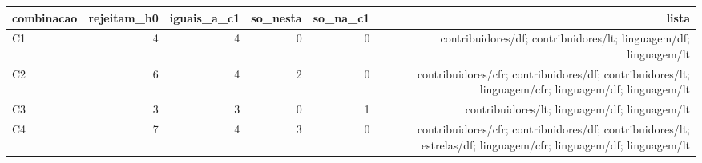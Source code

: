 \begin{tabular}{lrrrrr}
\hline
combinacao & rejeitam\_h0 & iguais\_a\_c1 & so\_nesta & so\_na\_c1 & lista \\
\hline
C1 & 4 & 4 & 0 & 0 & contribuidores/df; contribuidores/lt; linguagem/df; linguagem/lt \\
C2 & 6 & 4 & 2 & 0 & contribuidores/cfr; contribuidores/df; contribuidores/lt; linguagem/cfr; linguagem/df; linguagem/lt \\
C3 & 3 & 3 & 0 & 1 & contribuidores/lt; linguagem/df; linguagem/lt \\
C4 & 7 & 4 & 3 & 0 & contribuidores/cfr; contribuidores/df; contribuidores/lt; estrelas/df; linguagem/cfr; linguagem/df; linguagem/lt \\
\hline
\end{tabular}
